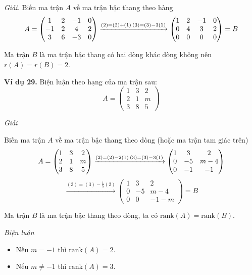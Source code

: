 \textit{Giải.}
Biến ma trận \( A \) về ma trận bậc thang theo hàng
\[
A = \begin{pmatrix}
1 & 2 & -1 & 0 \\
-1 & 2 & 4 & 2 \\
3 & 6 & -3 & 0
\end{pmatrix}
\xrightarrow{(2) = (2) + (1) \\ (3) = (3) - 3(1)}
\begin{pmatrix}
1 & 2 & -1 & 0 \\
0 & 4 & 3 & 2 \\
0 & 0 & 0 & 0
\end{pmatrix} = B
\]

Ma trận \( B \) là ma trận bậc thang có hai dòng khác dòng không nên \( r(A) = r(B) = 2 \).

\textbf{Ví dụ 29.} Biện luận theo hạng của ma trận sau:
\[
A = \begin{pmatrix}
1 & 3 & 2 \\
2 & 1 & m \\
3 & 8 & 5
\end{pmatrix}
\]

\textit{Giải}

Biến ma trận \( A \) về ma trận bậc thang theo dòng (hoặc ma trận tam giác trên)
\[
A = \begin{pmatrix}
1 & 3 & 2 \\
2 & 1 & m \\
3 & 8 & 5
\end{pmatrix}
\xrightarrow{(2) = (2) - 2(1) \\ (3) = (3) - 3(1)}
\begin{pmatrix}
1 & 3 & 2 \\
0 & -5 & m - 4 \\
0 & -1 & -1
\end{pmatrix}
\]
\[
\xrightarrow{(3) = (3) - \frac{1}{5}(2)}
\begin{pmatrix}
1 & 3 & 2 \\
0 & -5 & m - 4 \\
0 & 0 & -1 - m
\end{pmatrix} = B
\]

Ma trận \( B \) là ma trận bậc thang theo dòng, ta có \(\text{rank}(A) = \text{rank}(B)\).

\textit{Biện luận}
\begin{itemize}
    \item Nếu \( m = -1 \) thì \(\text{rank}(A) = 2\).
    \item Nếu \( m \neq -1 \) thì \(\text{rank}(A) = 3\).
\end{itemize}

